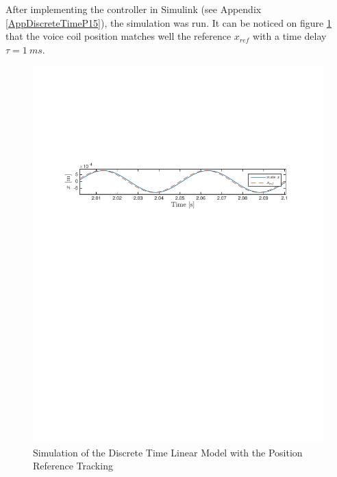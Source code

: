 After implementing the controller in Simulink (see Appendix \ref{AppDiscreteTimeP15}), the simulation was run. It can be noticed on figure \ref{fig:P15xref} that the voice coil position matches well the reference $x_{ref}$ with a time delay $\tau = 1 \ ms$.
\begin{figure}[H]
 \centering 
 \includegraphics[trim=2cm 17cm 2cm 7cm, clip=true, totalheight=0.12\textheight, angle=0]{figures/P15xref.pdf}
 \caption{Simulation of the Discrete Time Linear Model with the Position Reference Tracking}
 \label{fig:P15xref}
\end{figure}